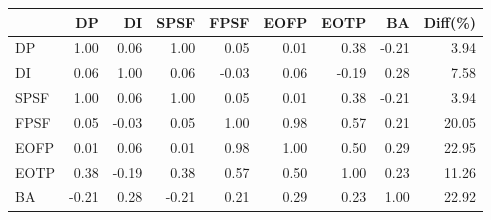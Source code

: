 \begin{tabular}{l|rrrrrrr|r}
\toprule
 & DP & DI & SPSF & FPSF & EOFP & EOTP & BA & Diff(\%)  \\
\midrule
DP & 1.00 & 0.06 & 1.00 & 0.05 & 0.01 & 0.38 & -0.21 & 3.94  \\
DI & 0.06 & 1.00 & 0.06 & -0.03 & 0.06 & -0.19 & 0.28 & 7.58  \\
SPSF & 1.00 & 0.06 & 1.00 & 0.05 & 0.01 & 0.38 & -0.21 & 3.94  \\
FPSF & 0.05 & -0.03 & 0.05 & 1.00 & 0.98 & 0.57 & 0.21 & 20.05  \\
EOFP & 0.01 & 0.06 & 0.01 & 0.98 & 1.00 & 0.50 & 0.29 & 22.95  \\
EOTP & 0.38 & -0.19 & 0.38 & 0.57 & 0.50 & 1.00 & 0.23 & 11.26  \\
BA & -0.21 & 0.28 & -0.21 & 0.21 & 0.29 & 0.23 & 1.00 & 22.92  \\
\bottomrule
\end{tabular}

